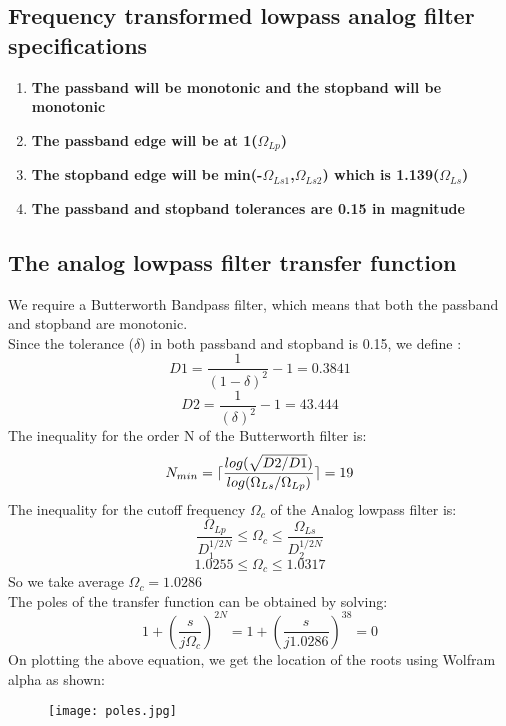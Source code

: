\documentclass[12pt]{article}
\DeclarePairedDelimiter\ceil{\lceil}{\rceil}
\begin{document}
\subsection{Frequency transformed lowpass analog filter specifications}
\begin{enumerate}
    \item \textbf{The passband will be monotonic and the stopband will be monotonic}
    \item \textbf{The passband edge will be at 1($\Omega_{Lp}$)}
    \item \textbf{The stopband edge will be min(-$\Omega_{Ls1}$,$\Omega_{Ls2}$) which is 1.139($\Omega_{Ls}$)}
    \item \textbf{The passband and stopband tolerances are 0.15 in magnitude}

\end{enumerate}
\newpage
\subsection{The analog lowpass filter transfer function}
We require a Butterworth Bandpass filter, which means that both the passband and stopband are monotonic.
\\Since the tolerance ($\delta$) in both passband and stopband is 0.15, we define :
\begin{equation}
    D1= \frac{1}{(1-\delta)^2}-1 = 0.3841
\end{equation}
\begin{equation}
    D2= \frac{1}{(\delta)^2}-1 = 43.444
\end{equation}
The inequality for the order N of the Butterworth filter is:
\begin{equation}
    N_{min}=\ceil{\frac{log(\sqrt{D2/D1})}{log(\Omega_{Ls}/\Omega_{Lp})}} = 19
\end{equation}
The inequality for the cutoff frequency $\Omega_{c}$ of the Analog lowpass filter is:
\begin{equation}
   \frac{ \Omega_{Lp}}{D_1^{1/2N}} \leq \Omega_{c} \leq \frac{ \Omega_{Ls}}{D_2^{1/2N}}
\end{equation}
\begin{equation}
   1.0255 \leq \Omega_{c} \leq 1.0317
\end{equation}
So we take average $\Omega_{c} = 1.0286$
\\The poles of the transfer function can be obtained by solving:
\begin{equation}
   1+ (\frac{s}{j\Omega_{c}})^{2N} = 1+ (\frac{s}{j1.0286})^{38} = 0
\end{equation}
On plotting the above equation, we get the location of the roots using Wolfram alpha as shown:
\begin{figure}[H]
    \centering
    \texttt{[image: poles.jpg]}
\end{figure}
\end{document}
